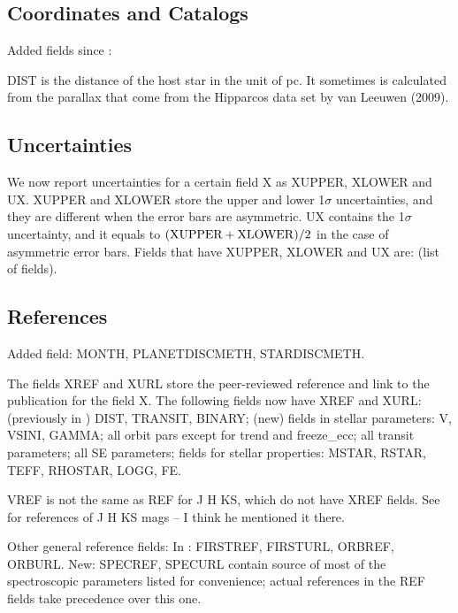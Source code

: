 \documentclass[11pt,preprint]{aastex}
\begin{document}
\begin{CJK*}{UTF8}{gbsn}
\subsection{Coordinates and Catalogs}

Added fields since \cite{Wright2011}:

DIST is the distance of the host star in the unit of pc. It sometimes is calculated from the parallax that come from the Hipparcos data set by van Leeuwen (2009).


\subsection{Uncertainties}

We now report uncertainties for a certain field X as XUPPER, XLOWER
and UX. XUPPER and XLOWER store the upper and lower 1$\sigma$
uncertainties, and they are different when the error bars are
asymmetric. UX contains the 1$\sigma$ uncertainty, and it
equals to $({\rm XUPPER+XLOWER})/2$ in the case of asymmetric error
bars. Fields that have XUPPER, XLOWER and UX are: (list of fields).

\subsection{References}

Added field: MONTH, PLANETDISCMETH, STARDISCMETH.

The fields XREF and XURL store the peer-reviewed reference and link to
the publication for the field X. The following fields now have XREF
and XURL: (previously in \citealt{Wright2011}) DIST, TRANSIT, BINARY;
(new) fields in stellar parameters: V, VSINI, GAMMA; all orbit pars except for
trend and freeze\_ecc; all transit parameters; all SE parameters;
fields for stellar properties: MSTAR, RSTAR, TEFF, RHOSTAR, LOGG, FE.

VREF is not the same as REF for J H KS, which do not have XREF
fields. See \cite{Wright2011} for references of J H KS mags -- I think
he mentioned it there.

Other general reference fields: In \cite{Wright2011}: FIRSTREF,
FIRSTURL, ORBREF, ORBURL. New: SPECREF, SPECURL contain source of most
of the spectroscopic parameters listed for convenience; actual
references in the REF fields take precedence over this one.


\end{CJK*}
\end{document}
